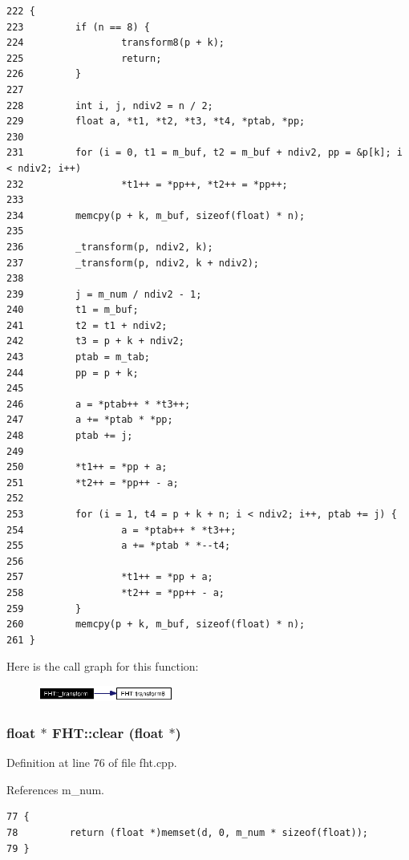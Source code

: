 \footnotesize\begin{verbatim}222 {
223         if (n == 8) {
224                 transform8(p + k);
225                 return;
226         }
227 
228         int i, j, ndiv2 = n / 2;
229         float a, *t1, *t2, *t3, *t4, *ptab, *pp;
230 
231         for (i = 0, t1 = m_buf, t2 = m_buf + ndiv2, pp = &p[k]; i < ndiv2; i++)
232                 *t1++ = *pp++, *t2++ = *pp++;
233 
234         memcpy(p + k, m_buf, sizeof(float) * n);
235 
236         _transform(p, ndiv2, k);
237         _transform(p, ndiv2, k + ndiv2);
238 
239         j = m_num / ndiv2 - 1;
240         t1 = m_buf;
241         t2 = t1 + ndiv2;
242         t3 = p + k + ndiv2;
243         ptab = m_tab;
244         pp = p + k;
245 
246         a = *ptab++ * *t3++;
247         a += *ptab * *pp;
248         ptab += j;
249 
250         *t1++ = *pp + a;
251         *t2++ = *pp++ - a;
252 
253         for (i = 1, t4 = p + k + n; i < ndiv2; i++, ptab += j) {
254                 a = *ptab++ * *t3++;
255                 a += *ptab * *--t4;
256 
257                 *t1++ = *pp + a;
258                 *t2++ = *pp++ - a;
259         }
260         memcpy(p + k, m_buf, sizeof(float) * n);
261 }
\end{verbatim}\normalsize 


Here is the call graph for this function:\begin{figure}[H]
\begin{center}
\leavevmode
\includegraphics[width=126pt]{classFHT_FHTd1_cgraph}
\end{center}
\end{figure}
\subsubsection{\setlength{\rightskip}{0pt plus 5cm}float $\ast$ FHT::clear (float $\ast$)}\label{classFHT_FHTa5}




Definition at line 76 of file fht.cpp.

References m\_\-num.



\footnotesize\begin{verbatim}77 {
78         return (float *)memset(d, 0, m_num * sizeof(float));
79 }
\end{verbatim}\normalsize 
{}
